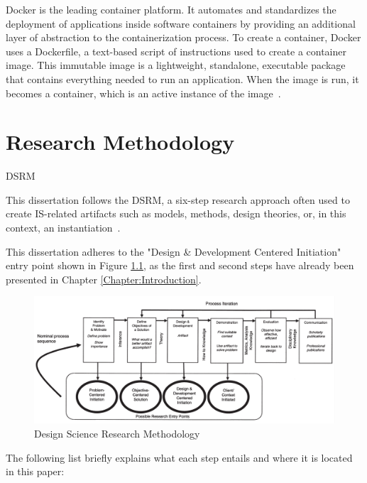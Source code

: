 \documentclass[12pt, reqno, oneside]{amsbook}
\makeatletter
\def\section{\@startsection{section}{1}%
      \z@{.5\linespacing\@plus.7\linespacing}{.25\linespacing}%
      {\normalfont\bfseries\flushleft}}
\theoremstyle{definition}
\theoremstyle{definition}
\numberwithin{section}{chapter}
\numberwithin{table}{chapter}
\numberwithin{figure}{chapter}
\makeatother
\begin{document}
Docker is the leading container platform. It automates and standardizes the deployment of applications inside software containers by providing an additional layer of abstraction to the containerization process. To create a container, Docker uses a Dockerfile, a text-based script of instructions used to create a container image. This immutable image is a lightweight, standalone, executable package that contains everything needed to run an application. When the image is run, it becomes a container, which is an active instance of the image~\cite{Figueira2024, Hardikar2021, Potdar2020}.


\chapter{Research Methodology}
\label{Chapter:Research_Methodology}

\section{\texorpdfstring{\ac{DSRM}}{DSRM}}

This dissertation follows the \ac{DSRM}, a six-step research approach often used to create \ac{IS}-related artifacts such as models, methods, design theories, or, in this context, an instantiation~\cite{Peffers2007}.

This dissertation adheres to the "Design \& Development Centered Initiation" entry point shown in Figure \ref{Figure:DSRM}, as the first and second steps have already been presented in Chapter \ref{Chapter:Introduction}.

\begin{figure}[H]
  \centering
  \includegraphics[width=1\linewidth]{images/DSRM_process_model.png}
  \caption{\label{Figure:DSRM}Design Science Research Methodology~\cite{Peffers2007}}
\end{figure}

The following list briefly explains what each step entails and where it is located in this paper:
\end{document}
